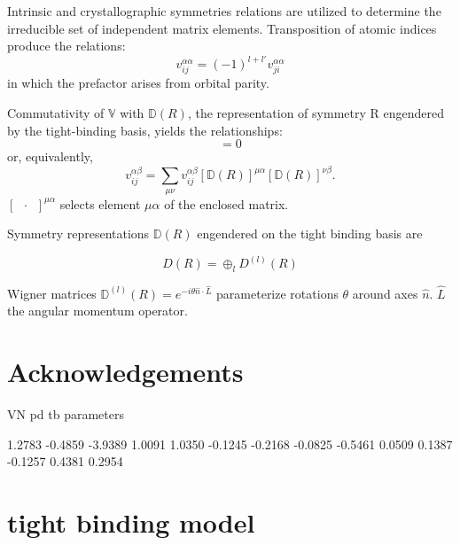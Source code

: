 \documentclass[preprint,showpacs,preprintnumbers,superscriptaddress,prb,floatfix,aps]{revtex4-1}
\newcommand*{\wignerD}{\mathbb{D}(R)}
\newcommand*{\wignerDl}{\mathbb{D}^{(l)}(R)}
\begin{document}
Intrinsic and crystallographic symmetries relations are utilized to determine the irreducible set of independent matrix elements. Transposition of atomic indices produce the relations:
\begin{equation}
\label{eq:transposition}
v_{ij}^{\alpha\alpha} = (-1)^{l+l'}v_{ji}^{\alpha\alpha}
\end{equation}
in which the prefactor arises from orbital parity.

Commutativity of $\mathbb{V}$ with $\wignerD$, the representation of symmetry R engendered by the tight-binding basis, yields the relationships:
\begin{equation}
[\mathbb{V},\wignerD] = 0
\end{equation}
or, equivalently,
\begin{equation}
\label{eq:stab}
v_{ij}^{\alpha\beta} = \sum_{\mu\nu} v_{ij}^{\alpha\beta} \left[\wignerD\right]^{\mu\alpha} \left[\wignerD\right]^{\nu\beta}.
\end{equation}
$\left[\phantom{a}\cdot\phantom{a}\right] ^{\mu\alpha}$ selects element $\mu\alpha$ of the enclosed matrix. 




Symmetry representations $\wignerD$ engendered on the tight binding basis are

\begin{equation}
D(R) = \oplus_l D^{(l)}(R)
\end{equation}


Wigner matrices $\wignerDl =  e^{-i\theta\hat{n}\cdot\hat{L}}$ parameterize rotations $\theta$ around axes $\hat{n}$. $\hat{L}$ the angular momentum operator. %

\section{Acknowledgements}



\clearpage

VN pd tb parameters

    1.2783
   -0.4859
   -3.9389
    1.0091
    1.0350
   -0.1245
   -0.2168
   -0.0825
   -0.5461
    0.0509
    0.1387
   -0.1257
    0.4381
    0.2954




\appendix


\section{tight binding model}\label{appendix:tb}
\end{document}
